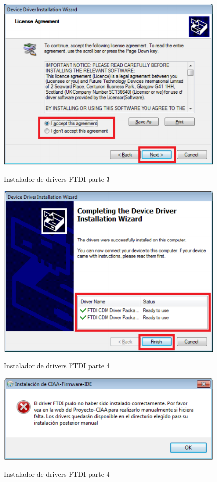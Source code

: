 \documentclass[12pt,letterpaper]{article}
\begin{document}
\begin{center}
\begin{figure}[!h]
\centering
\includegraphics[width=8 cm]{figuras/instalacion9.png}\\
\caption{Instalador de drivers FTDI parte 3}
\label{Fig11}
\end{figure}
\end{center}

\begin{center}
\begin{figure}[!h]
\centering
\includegraphics[width=8 cm]{figuras/instalacion10.png}\\
\caption{Instalador de drivers FTDI parte 4}
\label{Fig12}
\end{figure}
\end{center}

\begin{center}
\begin{figure}[!h]
\centering
\includegraphics[width=8 cm]{figuras/instalacion11.png}\\
\caption{Instalador de drivers FTDI parte 4}
\label{Fig13}
\end{figure}
\end{center}
\end{document}
